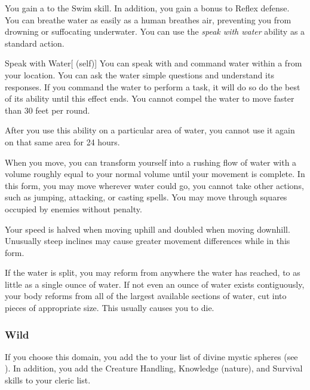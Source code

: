              You gain a   to the Swim skill.
            In addition, you gain a  bonus to Reflex defense.
             You can breathe water as easily as a human breathes air, preventing you from drowning or suffocating underwater.
             You can use the \textit{speak with water} ability as a standard action.
            \begin{attuneability}{Speak with Water}[ (self)]
                You can speak with and command water within a \areahuge {} from your location.
                You can ask the water simple questions and understand its responses.
                If you command the water to perform a task, it will do so do the best of its ability until this effect ends.
                You cannot compel the water to move faster than 30 feet per round.

                After you use this ability on a particular area of water, you cannot use it again on that same area for 24 hours.
            \end{attuneability}
            When you move, you can transform yourself into a rushing flow of water with a volume roughly equal to your normal volume until your movement is complete.
            In this form, you may move wherever water could go, you cannot take other actions, such as jumping, attacking, or casting spells.
            You may move through squares occupied by enemies without penalty.
            \par Your speed is halved when moving uphill and doubled when moving downhill.
            Unusually steep inclines may cause greater movement differences while in this form.
            \par If the water is split, you may reform from anywhere the water has reached, to as little as a single ounce of water.
            If not even an ounce of water exists contiguously, your body reforms from all of the largest available sections of water, cut into pieces of appropriate size.
            This usually causes you to die.

        \subsubsection{Wild}
            If you choose this domain, you add the   to your list of divine mystic spheres (see ).
            In addition, you add the Creature Handling, Knowledge (nature), and Survival skills to your cleric  list.

